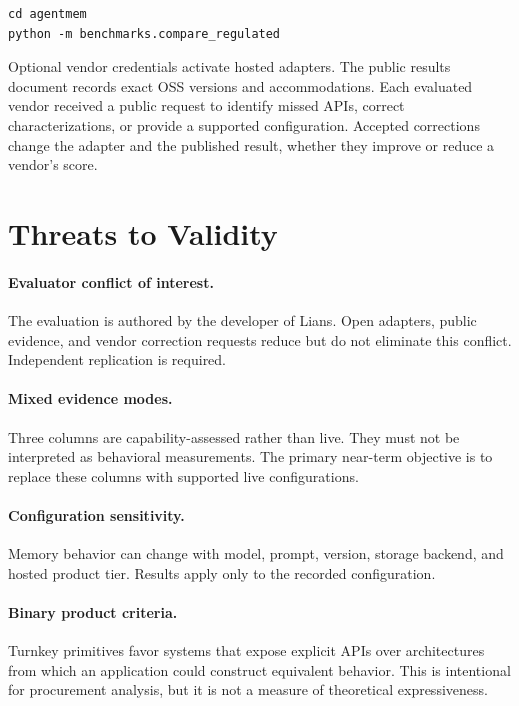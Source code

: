 \documentclass[10pt]{article}
\begin{document}
\begin{verbatim}
cd agentmem
python -m benchmarks.compare_regulated
\end{verbatim}

Optional vendor credentials activate hosted adapters. The public results document
records exact OSS versions and accommodations. Each evaluated vendor received a
public request to identify missed APIs, correct characterizations, or provide a
supported configuration. Accepted corrections change the adapter and the published
result, whether they improve or reduce a vendor's score.

\section{Threats to Validity}

\paragraph{Evaluator conflict of interest.}
The evaluation is authored by the developer of Lians. Open adapters, public evidence,
and vendor correction requests reduce but do not eliminate this conflict. Independent
replication is required.

\paragraph{Mixed evidence modes.}
Three columns are capability-assessed rather than live. They must not be interpreted
as behavioral measurements. The primary near-term objective is to replace these
columns with supported live configurations.

\paragraph{Configuration sensitivity.}
Memory behavior can change with model, prompt, version, storage backend, and hosted
product tier. Results apply only to the recorded configuration.

\paragraph{Binary product criteria.}
Turnkey primitives favor systems that expose explicit APIs over architectures from
which an application could construct equivalent behavior. This is intentional for
procurement analysis, but it is not a measure of theoretical expressiveness.
\end{document}
